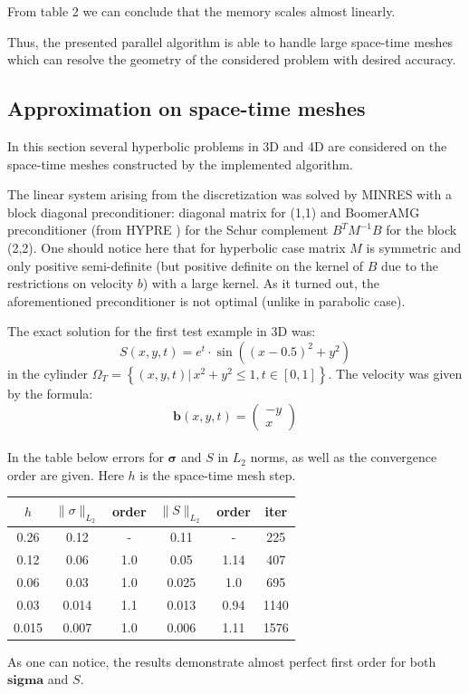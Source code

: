 \documentclass[12pt]{article}
\begin{document}
From table 2 we can conclude that the memory scales almost linearly. 

Thus, the presented parallel algorithm is able to handle large space-time meshes which can resolve the geometry of the considered problem with desired accuracy.

\subsection{Approximation on space-time meshes}

In this section several hyperbolic problems in 3D and 4D are considered on the space-time meshes constructed by the implemented algorithm.

The linear system arising from the discretization was solved by MINRES with a block diagonal preconditioner: diagonal matrix for (1,1) and BoomerAMG preconditioner (from HYPRE \cite{hypre}) for the Schur complement $B^T M^{-1} B$ for the block (2,2). One should notice here that for hyperbolic case matrix $M$ is symmetric and only positive semi-definite (but positive definite on the kernel of $B$ due to the restrictions on velocity $b$) with a large kernel. As it turned out, the aforementioned preconditioner is not optimal (unlike in parabolic case). 

The exact solution for the first test example in 3D was:
$$
S(x,y,t) = e^t \cdot \operatorname{sin} \left(
(x - 0.5)^2 + y^2 \right)$$
in the cylinder $\Omega_T = \left\{ (x,y,t) | \, x^2+y^2 \leq 1, t \in [0,1]  \right\}$.
The velocity was given by the formula:
$$
\mathbf{b}(x,y,t) = \left(
 \begin{array}{c}
 - y \\
 x
 \end{array}
  \right)
  $$ \\
In the table below errors for $\mathbf{\sigma}$ and $S$ in $L_2$ norms, as well as the convergence order are given. Here $h$ is the space-time mesh step.
\begin{center}
\begin{tabular}{|c|c|c|c|c|c|}
\hline
$h$ & $\parallel \sigma \parallel_{L_2}$ & order & $\parallel S \parallel_{L_2}$ & order  & iter \\
\hline
0.26  & 0.12  & -    	& 0.11  & -		& 225 \\ %
\hline
0.12  & 0.06  & 1.0     & 0.05  & 1.14	& 407 \\ %
\hline
0.06  & 0.03  & 1.0     & 0.025 & 1.0   & 695 \\ %
\hline
0.03  & 0.014 & 1.1     & 0.013 & 0.94  & 1140 \\ %
\hline
0.015 & 0.007 & 1.0     & 0.006 & 1.11  & 1576 \\ %
\hline
\end{tabular}
\end{center}
As one can notice, the results demonstrate almost perfect first order for both $\mathbf{sigma}$ and $S$.
\end{document}
